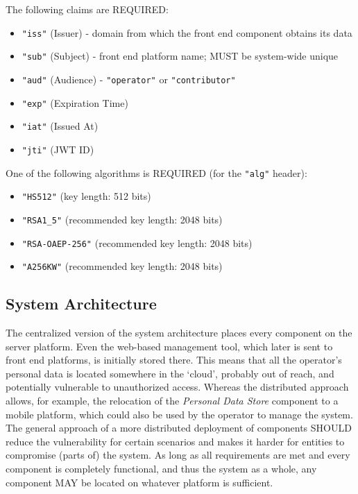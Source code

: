 \documentclass[12pt,english,a4paper,titlepage,cleardoublepage=empty,dottedtoc]{report}
\providecommand{\tightlist}{%
  \setlength{\itemsep}{0pt}\setlength{\parskip}{0pt}}
\begin{document}
The following claims are REQUIRED:

\begin{itemize}
\tightlist
\item
  \texttt{"iss"} (Issuer) - domain from which the front end component
  obtains its data
\item
  \texttt{"sub"} (Subject) - front end platform name; MUST be
  system-wide unique
\item
  \texttt{"aud"} (Audience) - \texttt{"operator"} or
  \texttt{"contributor"}
\item
  \texttt{"exp"} (Expiration Time)
\item
  \texttt{"iat"} (Issued At)
\item
  \texttt{"jti"} (JWT ID)
\end{itemize}

One of the following algorithms is REQUIRED (for the \texttt{"alg"}
header):

\begin{itemize}
\tightlist
\item
  \texttt{"HS512"} (key length: 512 bits)
\item
  \texttt{"RSA1\_5"} (recommended key length: 2048 bits)
\item
  \texttt{"RSA-OAEP-256"} (recommended key length: 2048 bits)
\item
  \texttt{"A256KW"} (recommended key length: 2048 bits)
\end{itemize}

\subsection{System Architecture}\label{system-architecture}

The centralized version of the system architecture places every
component on the server platform. Even the web-based management tool,
which later is sent to front end platforms, is initially stored there.
This means that all the operator's personal data is located somewhere in
the `cloud', probably out of reach, and potentially vulnerable to
unauthorized access. Whereas the distributed approach allows, for
example, the relocation of the \emph{Personal Data Store} component to a
mobile platform, which could also be used by the operator to manage the
system. The general approach of a more distributed deployment of
components SHOULD reduce the vulnerability for certain scenarios and
makes it harder for entities to compromise (parts of) the system. As
long as all requirements are met and every component is completely
functional, and thus the system as a whole, any component MAY be located
on whatever platform is sufficient.
\end{document}
